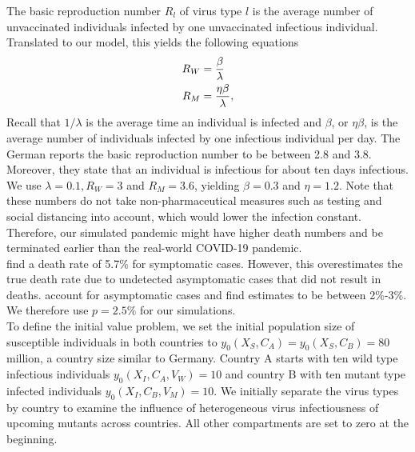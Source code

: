 The basic reproduction number $R_l$ of virus type $l$ is the average number of unvaccinated individuals infected by one unvaccinated infectious individual. Translated to our model, this yields the following equations 
\begin{align}
R_W &= \frac{\beta}{\lambda} \\
R_M &= \frac{\eta \beta}{\lambda}, \notag
\end{align}
Recall that $1/\lambda$ is the average time an individual is infected and $\beta$, or $\eta \beta$, is the average number of individuals infected by one infectious individual per day. The German \cite{RKI.2021} reports the basic reproduction number to be between 2.8 and 3.8. Moreover, they state that an individual is infectious for about ten days infectious. We use $\lambda = 0.1, R_W = 3$ and $R_M = 3.6$, yielding $\beta = 0.3$ and $\eta = 1.2$. Note that these numbers do not take non-pharmaceutical measures such as testing and social distancing into account, which would lower the infection constant. Therefore, our simulated pandemic might have higher death numbers and be terminated earlier than the real-world COVID-19 pandemic. \\%

\cite{Baud.2020} find a death rate of 5.7\% for symptomatic cases. However, this overestimates the true death rate due to undetected asymptomatic cases that did not result in deaths. \cite{Wu.2020} account for asymptomatic cases and find estimates to be between 2\%-3\%. We therefore use $p=2.5\%$ for our simulations.\\

To define the initial value problem, we set the initial population size of susceptible individuals in both countries to $y_0(X_S, C_A) = y_0(X_S, C_B) = 80$ million, a country size similar to Germany. Country A starts with ten wild type infectious individuals $y_0(X_I, C_A, V_W) = 10$ and country B with ten mutant type infected individuals $y_0(X_I, C_B, V_M) = 10$. We initially separate the virus types by country to examine the influence of heterogeneous virus infectiousness of upcoming mutants across countries. All other compartments are set to zero at the beginning. \\

